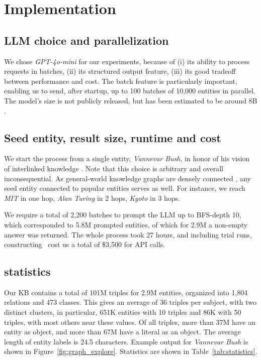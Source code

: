 \chapter{Implementation}
\label{sec:implementation}

\section{LLM choice and parallelization}
We chose \textit{GPT-4o-mini} \cite{openai2024gpt4technicalreport} for our experiments, because of (i) its ability to process requests in batches, (ii) its structured output feature, (iii) its good tradeoff between performance and cost. The batch feature is particularly important, enabling us to send, after startup, up to 100 batches of 10,000 entities in parallel. The model's size is not publicly released, but has been estimated to be around 8B \cite{gptparameters1,gptparameters2}.

\section{Seed entity, result size, runtime and cost} We start the process from a single entity, \textit{Vannevar Bush}, in honor of his vision of interlinked knowledge \cite{bush1945we}. 
Note that this choice is arbitrary and overall inconsequential.
As general-world knowledge graphs are densely connected \cite{hogan2021knowledge}, any seed entity connected to popular entities serves as well.
For instance, we reach \textit{MIT} in one hop, \textit{Alan Turing} in 2 hops, \textit{Kyoto} in 3 hops.

We require a total of 2,200 batches to prompt the LLM up to BFS-depth 10, which corresponded to 5.8M prompted entities, of which for 2.9M a non-empty answer was returned. The whole process took 27 hours, and including trial runs, constructing \ourkb\ cost us a total of \$3,500 for 
API calls.

\section{\ourkb{} statistics}
Our KB contains a total of 101M triples for 2.9M entities, organized into 1,804 relations and 473 classes. This gives an average of 36 triples per subject, with two distinct clusters, in particular, 651K entities with 10 triples and 86K with 50 triples, with most others near these values. Of all triples, more than 37M have an entity as object, and more than 67M have a literal as an object. The average length of entity labels is 24.5 characters. Example output for \textit{Vannevar Bush} is shown in 
Figure~\ref{fig:graph_explore}.
Statistics are shown in Table~\ref{tab:statistics}.

